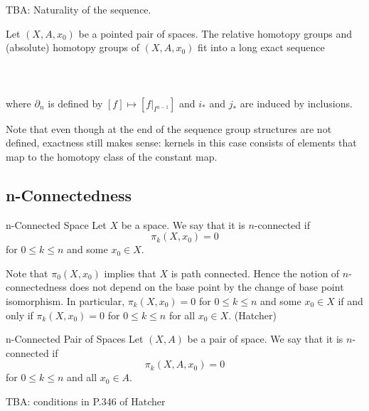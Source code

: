 \documentclass[a4paper]{article}
\begin{document}
TBA: Naturality of the sequence. 

\begin{thm}{}{} Let $(X,A,x_0)$ be a pointed pair of spaces. The relative homotopy groups and (absolute) homotopy groups of $(X,A,x_0)$ fit into a long exact sequence \\~\\
\\~\\
where $\partial_n$ is defined by $[f]\mapsto [f|_{I^{n-1}}]$ and $i_\ast$ and $j_\ast$ are induced by inclusions. 
\end{thm}

Note that even though at the end of the sequence group structures are not defined, exactness still makes sense: kernels in this case consists of elements that map to the homotopy class of the constant map. 


\subsection{n-Connectedness}
\begin{defn}{n-Connected Space}{} Let $X$ be a space. We say that it is $n$-connected if $$\pi_k(X,x_0)=0$$ for $0\leq k\leq n$ and some $x_0\in X$. 
\end{defn}

Note that $\pi_0(X,x_0)$ implies that $X$ is path connected. Hence the notion of $n$-connectedness does not depend on the base point by the change of base point isomorphism. In particular, $\pi_k(X,x_0)=0$ for $0\leq k\leq n$ and some $x_0\in X$ if and only if $\pi_k(X,x_0)=0$ for $0\leq k\leq n$ for all $x_0\in X$. (Hatcher)

\begin{defn}{n-Connected Pair of Spaces}{} Let $(X,A)$ be a pair of space. We say that it is $n$-connected if $$\pi_k(X,A,x_0)=0$$ for $0\leq k\leq n$ and all $x_0\in A$. 
\end{defn}

TBA: conditions in P.346 of Hatcher
\end{document}
